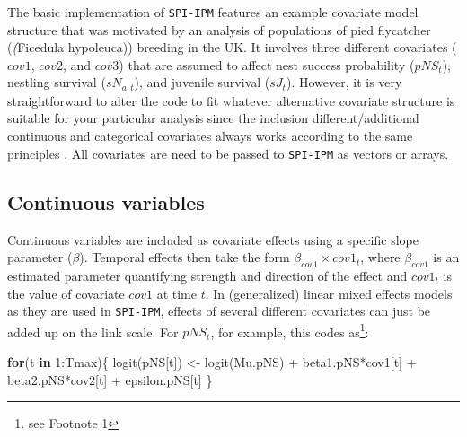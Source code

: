 \documentclass[
]{book}
\newenvironment{Shaded}{\begin{snugshade}}{\end{snugshade}}
\newcommand{\ControlFlowTok}[1]{\textcolor[rgb]{0.13,0.29,0.53}{\textbf{#1}}}
\newcommand{\DecValTok}[1]{\textcolor[rgb]{0.00,0.00,0.81}{#1}}
\newcommand{\FunctionTok}[1]{\textcolor[rgb]{0.00,0.00,0.00}{#1}}
\newcommand{\NormalTok}[1]{#1}
\newcommand{\OtherTok}[1]{\textcolor[rgb]{0.56,0.35,0.01}{#1}}
\newcommand{\SpecialCharTok}[1]{\textcolor[rgb]{0.00,0.00,0.00}{#1}}
\begin{document}
The basic implementation of \texttt{SPI-IPM} features an example covariate model
structure that was motivated by an analysis of populations of pied flycatcher
(\textit(Ficedula hypoleuca)) breeding in the UK. It involves three different
covariates (\(cov1\), \(cov2\), and \(cov3\)) that are assumed to affect nest success
probability (\(pNS_{t}\)), nestling survival (\(sN_{a,t}\)), and juvenile survival
(\(sJ_t\)). However, it is very straightforward to alter the code to fit whatever
alternative covariate structure is suitable for your particular analysis since
the inclusion different/additional continuous and categorical covariates always
works according to the same principles \citep[see also][]{kery2011}. All covariates are
need to be passed to \texttt{SPI-IPM} as vectors or arrays.

\hypertarget{continuous-variables}{%
\subsection{Continuous variables}\label{continuous-variables}}

Continuous variables are included as covariate effects using a specific slope
parameter (\(\beta\)). Temporal effects then take the form
\(\beta_{cov1}\times cov1_t\), where \(\beta_{cov1}\) is an estimated parameter
quantifying strength and direction of the effect and \(cov1_t\) is the value of
covariate \(cov1\) at time \(t\).
In (generalized) linear mixed effects models as they are used in \texttt{SPI-IPM},
effects of several different covariates can just be added up on the link scale.
For \(pNS_t\), for example, this codes as\footnote{see Footnote 1}:

\begin{Shaded}
\begin{Highlighting}[]
\ControlFlowTok{for}\NormalTok{(t }\ControlFlowTok{in} \DecValTok{1}\SpecialCharTok{:}\NormalTok{Tmax)\{}
  \FunctionTok{logit}\NormalTok{(pNS[t]) }\OtherTok{\textless{}{-}} \FunctionTok{logit}\NormalTok{(Mu.pNS) }\SpecialCharTok{+}\NormalTok{ beta1.pNS}\SpecialCharTok{*}\NormalTok{cov1[t] }\SpecialCharTok{+}\NormalTok{ beta2.pNS}\SpecialCharTok{*}\NormalTok{cov2[t] }\SpecialCharTok{+}\NormalTok{ epsilon.pNS[t]}
\NormalTok{\}}
\end{Highlighting}
\end{Shaded}
\end{document}
